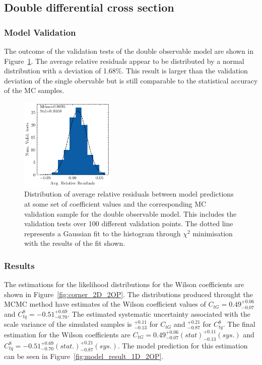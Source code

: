 \documentclass[a4paper,11pt]{article}
\begin{document}
\subsection{Double differential cross section}
\subsubsection{Model Validation}
The outcome of the validation tests of the double observable model are shown in Figure~\ref{fig:residuals_hist_2D}.
The average relative residuals appear to be distributed by a normal distribution with a deviation of 1.68\%.
This result is larger than the validation deviation of the single obervable but is still comparable to the statistical accuracy of the MC samples.


\begin{figure}[htb]
    \centering
    \includegraphics[width=0.4\textwidth]{plots/residuals_hist_2D.png}
    \caption{Distribution of average relative residuals between model predictions at some set of coefficient values and the corresponding MC validation sample for the double observable model. This includes the validation tests over 100 different validation points. The dotted line represents a Gaussian fit to the histogram through $\chi^2$ minimisation with the results of the fit shown.}
    \label{fig:residuals_hist_2D}
\end{figure}

\subsubsection{Results}

The estimations for the likelihood distributions for the Wilson coefficients are shown in Figure~\ref{fig:corner_2D_2OP}.
The distributions produced throught the MCMC method have estimates of the Wilson coefficient values of $C_{tG}=0.49_{-0.07}^{+0.06}$ and $C_{tq}^{8}=-0.51_{-0.70}^{+0.69}$.
The estimated systematic uncertainty associated with the scale variance of the simulated samples is $^{+0.11}_{-0.13}$ for $C_{tG}$ and $^{+0.21}_{-0.87}$ for $C_{tq}^{8}$. 
The final estimation for the Wilson coefficients are $C_{tG} = 0.49_{-0.07}^{+0.06}(stat) ^{+0.11}_{-0.13} (sys.)$ and $C_{tq}^{8}=-0.51_{-0.70}^{+0.69} (stat.) ^{+0.21}_{-0.87} (sys.)$.
The model prediction for this estimation can be seen in Figure~\ref{fig:model_result_1D_2OP}.
\end{document}
